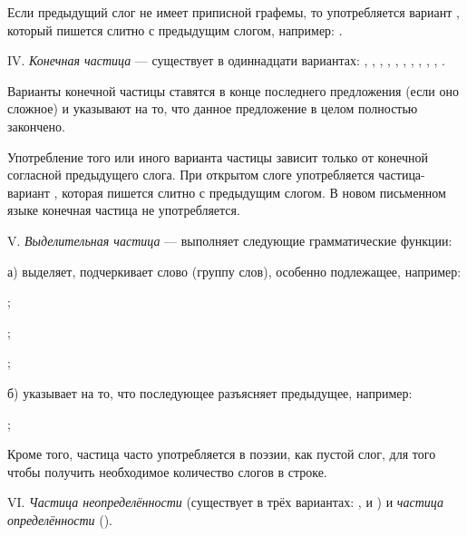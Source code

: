 Если предыдущий слог не имеет приписной графемы, то употребляется вариант , который пишется слитно с предыдущим слогом, например: .

IV.	\emph{Конечная частица} --- существует в одиннадцати вариантах:
, , ,
, , ,
, , ,
, .

Варианты конечной частицы ставятся в конце последнего предложения (если оно сложное) и указывают на то, что данное предложение в целом полностью закончено.

Употребление того или иного варианта частицы зависит только от конечной согласной предыдущего слога. При открытом слоге употребляется частица-вариант , которая пишется слитно с предыдущим слогом. В новом письменном языке конечная частица не употребляется.

V. \emph{Выделительная частица}  --- выполняет следующие грамматические функции:

а) выделяет, подчеркивает слово (группу слов), особенно подлежащее, например:
\begin{prfsample}
	\item {};
	\item {};
	\item {};
\end{prfsample}

б) указывает на то, что последующее разъясняет предыдущее, например:
\begin{prfsample}
	\item {};
\end{prfsample}

Кроме того, частица  часто употребляется в поэзии, как пустой слог, для того чтобы получить необходимое количество слогов в строке.

VI.	\emph{Частица неопределённости} (существует в трёх вариантах: ,  и ) и \emph{частица определённости} ().

